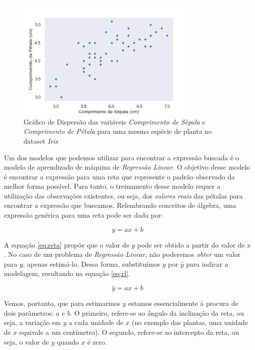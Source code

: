 \begin{figure}[H]
    \centering
    \includegraphics[width=0.8\textwidth]{img/iris_scatter.png}
    \caption{Gráfico de Dispersão das variáveis \textit{Comprimento de Sépala} e \textit{Comprimento de Pétala} para uma mesma espécie de planta no dataset \textit{Iris}}
    \label{fig:dispersao}
\end{figure}

Um dos modelos que podemos utilizar para encontrar a expressão buscada é o modelo de aprendizado de máquina de \textit{Regressão Linear}. O objetivo desse modelo é encontrar a expressão para uma reta que represente o padrão observado da melhor forma possível. Para tanto, o treinamento desse modelo requer a utilização das observações existentes, ou seja, dos \textit{valores reais} das pétalas para encontrar a expressão que buscamos. Relembrando conceitos de álgebra, uma expressão genérica para uma reta pode ser dada por:

\begin{equation}
\label{eq:reta}
    y = ax + b
\end{equation}

A equação \ref{eq:reta} propõe que o valor de $y$ pode ser obtido a partir do valor de $x$.
No caso de um problema de \textit{Regressão Linear}, não poderemos \textit{obter} um valor para $y$, apenas estimá-lo. Dessa forma, substituímos $y$ por $\hat{y}$ para indicar a modelagem, resultando na equação \ref{eq:rl}.

\begin{equation}
\label{eq:rl}
    \hat{y} = ax + b
\end{equation}

 Vemos, portanto, que para estimarmos $y$ estamos essencialmente à procura de dois parâmetros: $a$ e $b$. O primeiro, refere-se ao ângulo da inclinação da reta, ou seja, a variação em $y$ a cada unidade de $x$ (no exemplo das plantas, uma unidade de $x$ equivale a um centímetro). O segundo, refere-se ao intercepto da reta, ou seja, o valor de $y$ quando $x$ é zero. 

